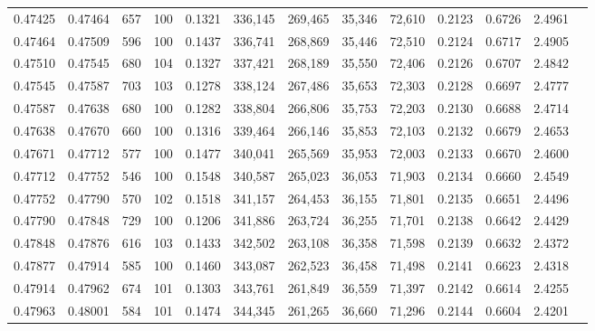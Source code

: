 \begin{tabular}{rrrrrrrrrrrrr}
0.47425 & 0.47464 &   657 & 100 &                                     0.1321 & 336,145 & 269,465 &  35,346 &  72,610 & 0.2123 & 0.6726 & 2.4961 \\
0.47464 & 0.47509 &   596 & 100 &                                     0.1437 & 336,741 & 268,869 &  35,446 &  72,510 & 0.2124 & 0.6717 & 2.4905 \\
0.47510 & 0.47545 &   680 & 104 &                                     0.1327 & 337,421 & 268,189 &  35,550 &  72,406 & 0.2126 & 0.6707 & 2.4842 \\
0.47545 & 0.47587 &   703 & 103 &                                     0.1278 & 338,124 & 267,486 &  35,653 &  72,303 & 0.2128 & 0.6697 & 2.4777 \\
0.47587 & 0.47638 &   680 & 100 &                                     0.1282 & 338,804 & 266,806 &  35,753 &  72,203 & 0.2130 & 0.6688 & 2.4714 \\
0.47638 & 0.47670 &   660 & 100 &                                     0.1316 & 339,464 & 266,146 &  35,853 &  72,103 & 0.2132 & 0.6679 & 2.4653 \\
0.47671 & 0.47712 &   577 & 100 &                                     0.1477 & 340,041 & 265,569 &  35,953 &  72,003 & 0.2133 & 0.6670 & 2.4600 \\
0.47712 & 0.47752 &   546 & 100 &                                     0.1548 & 340,587 & 265,023 &  36,053 &  71,903 & 0.2134 & 0.6660 & 2.4549 \\
0.47752 & 0.47790 &   570 & 102 &                                     0.1518 & 341,157 & 264,453 &  36,155 &  71,801 & 0.2135 & 0.6651 & 2.4496 \\
0.47790 & 0.47848 &   729 & 100 &                                     0.1206 & 341,886 & 263,724 &  36,255 &  71,701 & 0.2138 & 0.6642 & 2.4429 \\
0.47848 & 0.47876 &   616 & 103 &                                     0.1433 & 342,502 & 263,108 &  36,358 &  71,598 & 0.2139 & 0.6632 & 2.4372 \\
0.47877 & 0.47914 &   585 & 100 &                                     0.1460 & 343,087 & 262,523 &  36,458 &  71,498 & 0.2141 & 0.6623 & 2.4318 \\
0.47914 & 0.47962 &   674 & 101 &                                     0.1303 & 343,761 & 261,849 &  36,559 &  71,397 & 0.2142 & 0.6614 & 2.4255 \\
0.47963 & 0.48001 &   584 & 101 &                                     0.1474 & 344,345 & 261,265 &  36,660 &  71,296 & 0.2144 & 0.6604 & 2.4201 \\

\end{tabular}
